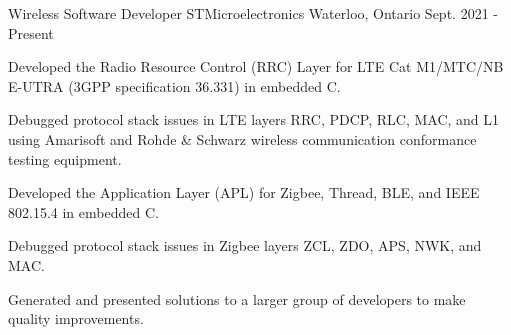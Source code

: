 
\begin{cventries}

  \cventry
    {Wireless Software Developer} %
    {STMicroelectronics} %
    {Waterloo, Ontario} %
    {Sept. 2021 - Present} %
    {
      \begin{cvitems} %
        \item {Developed the Radio Resource Control (RRC) Layer for LTE Cat M1/MTC/NB E-UTRA (3GPP specification 36.331) in embedded C.}
        \item {Debugged protocol stack issues in LTE layers RRC, PDCP, RLC, MAC, and L1 using Amarisoft and Rohde \& Schwarz wireless communication conformance testing equipment.}
        \item {Developed the Application Layer (APL) for Zigbee, Thread, BLE, and IEEE 802.15.4 in embedded C.}
		\item {Debugged protocol stack issues in Zigbee layers ZCL, ZDO, APS, NWK, and MAC.}
        \item {Generated and presented solutions to a larger group of developers to make quality improvements.}
      \end{cvitems}
    }


\end{cventries}
